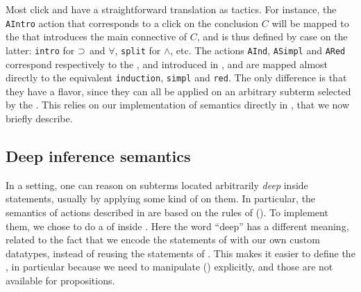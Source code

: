 Most click and  have a straightforward translation as 
tactics. For instance, the \texttt{AIntro} action that corresponds to a click on
the conclusion $C$ will be mapped to the   that introduces
the main connective of $C$, and is thus defined by case on the latter:
\texttt{intro} for $\supset$ and $\forall$, \texttt{split} for $\land$, etc. The
actions \texttt{AInd}, \texttt{ASimpl} and \texttt{ARed} correspond respectively
to the  ,  and
 introduced in , and are mapped almost directly
to the equivalent   \texttt{induction}, \texttt{simpl} and
\texttt{red}. The only difference is that they have a \emph{}
flavor, since they can all be applied on an arbitrary subterm selected by the
. This relies on our implementation of 
semantics directly in , that we now briefly describe.

\subsection{Deep inference semantics}

\AP
In a  setting, one can reason on subterms located arbitrarily
\emph{deep} inside statements, usually by applying some kind of  on them. In particular, the semantics of  actions described in
 are based on the rules of  (). To implement
them, we chose to do a  of  inside . Here
the word ``deep'' has a different meaning, related to the fact that we encode
the statements of  with our own custom datatypes, instead of reusing the
statements of . This makes it easier to define the 
, in particular because we need to manipulate
\emph{} () explicitly, and those are not
available for  propositions.

